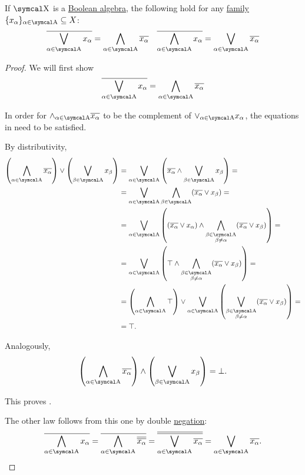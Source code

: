 \begin{theorem}\label{thm:de_morgans_laws}
  If \( \CX \) is a \hyperref[def:boolean_algebra]{Boolean algebra}, the following hold for any \hyperref[def:indexed_family]{family} \( \{ x_\al \}_{\al \in \CA} \subseteq X \):
  \begin{align*}
    \Ol{\bigvee_{\al \in \CA} x_\al} = \bigwedge_{\al \in \CA} \Ol{x_\al}
    &&
    \Ol{\bigwedge_{\al \in \CA} x_\al} = \bigvee_{\al \in \CA} \Ol{x_\al}
  \end{align*}
\end{theorem}
\begin{proof}
  We will first show
  \begin{equation}\label{thm:de_morgans_laws/equation}
    \Ol{\bigvee_{\al \in \CA} x_\al} = \bigwedge_{\al \in \CA} \Ol{x_\al}
  \end{equation}

  In order for \( \wedge_{\al \in \CA} \Ol{x_\al} \) to be the complement of \( \vee_{\al \in \CA} x_\al \), the equations in  need to be satisfied.

  By distributivity,
  \begin{align*}
    \left( \bigwedge_{\al \in \CA} \Ol{x_\al} \right) \vee \left( \bigvee_{\beta \in \CA} x_\beta \right)
    &=
    \bigvee_{\al \in \CA} \left( \Ol{x_\al} \wedge \bigvee_{\beta \in \CA} x_\beta \right)
    = \\ &=
    \bigvee_{\al \in \CA} \bigwedge_{\beta \in \CA} (\Ol{x_\al} \vee x_\beta)
    = \\ &=
    \bigvee_{\al \in \CA} \left( (\Ol{x_\al} \vee x_\al) \wedge \bigwedge_{\substack{\beta \in \CA \\ \beta \neq \al}} (\Ol{x_\al} \vee x_\beta) \right)
    = \\ &=
    \bigvee_{\al \in \CA} \left( \top \wedge \bigwedge_{\substack{\beta \in \CA \\ \beta \neq \al}} (\Ol{x_\al} \vee x_\beta) \right)
    = \\ &=
    \left( \bigwedge_{\al \in \CA} \top \right) \vee \bigvee_{\al \in \CA} \left( \bigvee_{\substack{\beta \in \CA \\ \beta \neq \al}} (\Ol{x_\al} \vee x_\beta) \right)
    = \\ &=
    \top.
  \end{align*}

  Analogously,
  \begin{equation*}
    \left( \bigwedge_{\al \in \CA} \Ol{x_\al} \right) \wedge \left( \bigvee_{\beta \in \CA} x_\beta \right) = \bot.
  \end{equation*}

  This proves .

  The other law follows from this one by double \hyperref[thm:boolean_algebra_properties]{negation}:
  \begin{equation*}
    \Ol{\bigwedge_{\al \in \CA} x_\al}
    =
    \Ol{\bigwedge_{\al \in \CA} \Ol{\Ol{x_\al}}}
    =
    \Ol{\Ol{\bigvee_{\al \in \CA} \Ol{x_\al}}}
    =
    \bigvee_{\al \in \CA} \Ol{x_\al}.
  \end{equation*}
\end{proof}

